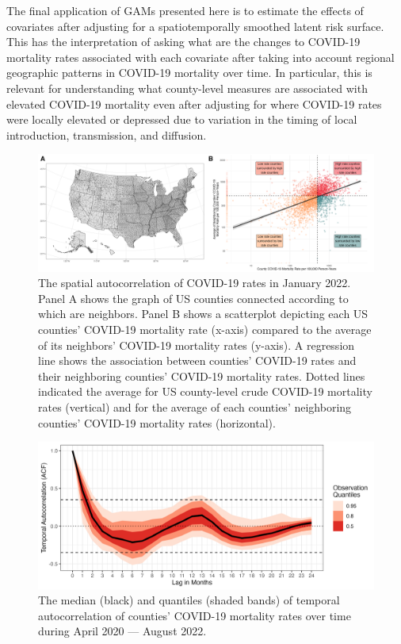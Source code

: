 \documentclass[
]{article}
\begin{document}
The final application of GAMs presented here is to estimate the effects of
covariates after adjusting for a spatiotemporally smoothed latent risk surface.
This has the interpretation of asking what are the changes to
COVID-19 mortality rates associated with each covariate after taking into
account regional geographic patterns in COVID-19 mortality over time. In
particular, this is relevant for understanding what county-level measures are
associated with elevated COVID-19 mortality even after adjusting for where
COVID-19 rates were locally elevated or depressed due to variation in the timing
of local introduction, transmission, and diffusion.

\begin{figure}
\includegraphics[width=1\linewidth]{figures/county_network_and_morans_plot} \caption{The spatial autocorrelation of COVID-19 rates in January 2022. Panel A shows the graph of US counties connected according to which are neighbors. Panel B shows a scatterplot depicting each US counties' COVID-19 mortality rate (x-axis) compared to the average of its neighbors' COVID-19 mortality rates (y-axis). A regression line shows the association between counties' COVID-19 rates and their neighboring counties' COVID-19 mortality rates.  Dotted lines indicated the average for US county-level crude COVID-19 mortality rates (vertical) and for the average of each counties' neighboring counties' COVID-19 mortality rates (horizontal).}\label{fig:neighboring-graph-morans-i}
\end{figure}

\begin{figure}

{\centering \includegraphics[width=0.5\linewidth]{figures/temporal_acf} 

}

\caption{The median (black) and quantiles (shaded bands) of temporal autocorrelation of counties' COVID-19 mortality rates over time during April 2020 — August 2022.}\label{fig:temporal-acf}
\end{figure}
\end{document}
